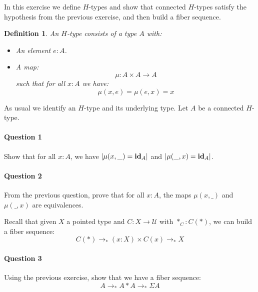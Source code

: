 \documentclass{article}[6pt]%
\newcommand{\U}{{\mathcal U}}
\renewcommand{\r}{\rightarrow}
\newcommand{\id}{\mathrm{\bf id}}
\newtheorem{definition}{Definition}
\begin{document}
\begin{Exercise}[title={$H$-types}]

In this exercise we define $H$-types and show that connected $H$-types satisfy the hypothesis from the previous exercise, and then build a fiber sequence.

\begin{definition}
An $H$-type consists of a type $A$ with:
\begin{itemize}
\item An element $e:A$.
\item A map: 
\[\mu : A\times A \r A\] 
such that for all $x:A$ we have:
\[\mu(x,e) = \mu(e,x)= x\]
\end{itemize} 
\end{definition}

As usual we identify an $H$-type and its underlying type. Let $A$ be a connected $H$-type.

\paragraph{Question 1} Show that for all $x:A$, we have $|\mu(x,\_) = \id_A|$ and $|\mu(\_,x) = \id_A|$.

\paragraph{Question 2} From the previous question, prove that for all $x:A$, the maps $\mu(x,\_)$ and $\mu(\_,x)$ are equivalences.

\vspace{0.4cm}

Recall that given $X$ a pointed type and $C:X\r \U$ with $*_C:C(*)$, we can build a fiber sequence:
\[C(*) \r_* (x:X)\times C(x) \r_* X\]

\paragraph{Question 3} Using the previous exercise, show that we have a fiber sequence:
\[A\r_* A\ast A\r_*\Sigma A\] 

\end{Exercise}
\end{document}
